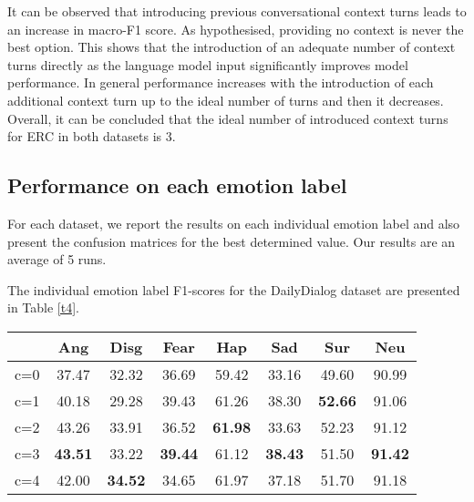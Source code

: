 \documentclass[11pt]{article}
\begin{document}
It can be observed that introducing previous conversational context turns leads to an increase in macro-F1 score. As hypothesised, providing no context is never the best option. This shows that the introduction of an adequate number of context turns directly as the language model input significantly improves model performance. In general performance increases with the introduction of each additional context turn up to the ideal number of turns and then it decreases. Overall, it can be concluded that the ideal number of introduced context turns for ERC in both datasets is 3.




\subsection{Performance on each emotion label}

For each dataset, we report the results on each individual emotion label and also present the confusion matrices for the best determined  value. Our results are an average of 5 runs.

The individual emotion label F1-scores for the DailyDialog dataset are presented in Table \ref{t4}.

\begin{table*}[t]
 \centering
 \caption{Model performance on each individual emotion label on the \textbf{DailyDialog} dataset with the introduction of  conversational turns}
  \begin{tabular}{cccccccc}
    \hline
     & \textbf{Ang} & \textbf{Disg} & \textbf{Fear} & \textbf{Hap} &\textbf{Sad} & \textbf{Sur} &\textbf{ Neu}   \\
    \hline
    c=0& 37.47 & 32.32 & 36.69 & 59.42 & 33.16 & 49.60 & 90.99    \\
    c=1 & 40.18 & 29.28 & 39.43 & 61.26 & 38.30 & \textbf{52.66} & 91.06 \\
    c=2& 43.26 & 33.91 & 36.52 & \textbf{61.98} & 33.63 & 52.23 & 91.12   \\
    c=3& \textbf{43.51} & 33.22 &\textbf{39.44} & 61.12 & \textbf{38.43} & 51.50 & \textbf{91.42} \\
    c=4&42.00 & \textbf{34.52} & 34.65 & 61.97 & 37.18 & 51.70 & 91.18 \\
    
    \hline
  \end{tabular} 
 \label{t4}
\end{table*}
\end{document}
